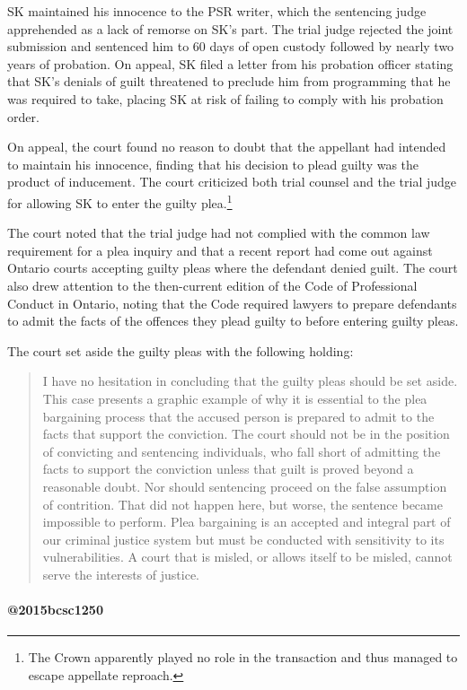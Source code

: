 SK maintained his innocence to the PSR writer, which the sentencing judge apprehended as a lack of remorse on SK's part. The trial judge rejected the joint submission and sentenced him to 60 days of open custody followed by nearly two years of probation. On appeal, SK filed a letter from his probation officer stating that SK's denials of guilt threatened to preclude him from programming that he was required to take, placing SK at risk of failing to comply with his probation order.

On appeal, the court found no reason to doubt that the appellant had intended to maintain his innocence, finding that his decision to plead guilty was the product of inducement. The court criticized both trial counsel and the trial judge for allowing SK to enter the guilty plea.\footnote{The Crown apparently played no role in the transaction and thus managed to escape appellate reproach.}

The court noted that the trial judge had not complied with the common law requirement for a plea inquiry and that a recent report had come out against Ontario courts accepting guilty pleas where the defendant denied guilt. The court also drew attention to the then-current edition of the Code of Professional Conduct in Ontario, noting that the Code required lawyers to prepare defendants to admit the facts of the offences they plead guilty to before entering guilty pleas.

The court set aside the guilty pleas with the following holding:
\begin{quote}
    I have no hesitation in concluding that the guilty pleas should be set aside. This case presents a graphic example of why it is essential to the plea bargaining process that the accused person is prepared to admit to the facts that support the conviction. The court should not be in the position of convicting and sentencing individuals, who fall short of admitting the facts to support the conviction unless that guilt is proved beyond a reasonable doubt. Nor should sentencing proceed on the false assumption of contrition. That did not happen here, but worse, the sentence became impossible to perform. Plea bargaining is an accepted and integral part of our criminal justice system but must be conducted with sensitivity to its vulnerabilities. A court that is misled, or allows itself to be misled, cannot serve the interests of justice.
\end{quote}

\paragraph{@2015bcsc1250\\}



